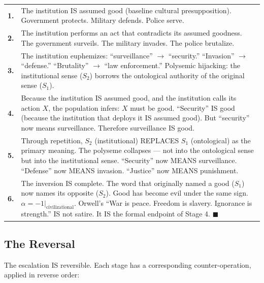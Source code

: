 \documentclass[11pt, oneside]{article}
\theoremstyle{definition}
\begin{document}
{\small
\noindent\begin{tabular}{r p{}}
\textbf{1.} & The institution IS assumed good (baseline cultural presupposition). Government protects. Military defends. Police serve. \\[0.3em]
\textbf{2.} & The institution performs an act that contradicts its assumed goodness. The government surveils. The military invades. The police brutalize. \\[0.3em]
\textbf{3.} & The institution euphemizes: ``surveillance'' $\to$ ``security.'' ``Invasion'' $\to$ ``defense.'' ``Brutality'' $\to$ ``law enforcement.'' Polysemic hijacking: the institutional sense ($S_2$) borrows the ontological authority of the original sense ($S_1$). \\[0.3em]
\textbf{4.} & Because the institution IS assumed good, and the institution calls its action $X$, the population infers: $X$ must be good. ``Security'' IS good (because the institution that deploys it IS assumed good). But ``security'' now means surveillance. Therefore surveillance IS good. \\[0.3em]
\textbf{5.} & Through repetition, $S_2$ (institutional) REPLACES $S_1$ (ontological) as the primary meaning. The polyseme collapses --- not into the ontological sense but into the institutional sense. ``Security'' now MEANS surveillance. ``Defense'' now MEANS invasion. ``Justice'' now MEANS punishment. \\[0.3em]
\textbf{6.} & The inversion IS complete. The word that originally named a good ($S_1$) now names its opposite ($S_2$). Good has become evil under the same sign. $\alpha = -1|_{\text{civilizational}}$. Orwell's ``War is peace. Freedom is slavery. Ignorance is strength.'' IS not satire. It IS the formal endpoint of Stage 4. \hfill $\blacksquare$ \\[0.3em]
\end{tabular}
}

\subsection{The Reversal}

The escalation IS reversible. Each stage has a corresponding counter-operation, applied in reverse order:
\end{document}

